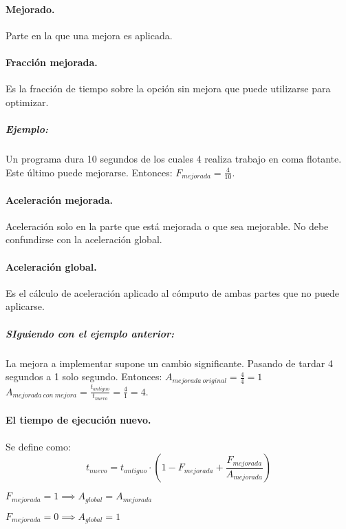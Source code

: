 \documentclass{article}
\begin{document}
\begin{multicols}{2}
		\paragraph{Mejorado.}
		Parte en la que una mejora es aplicada.
		
		\paragraph{Fracción mejorada.}
		Es la fracción de tiempo sobre la opción sin mejora que puede utilizarse para optimizar. 
		
		\subparagraph{Ejemplo:}
		Un programa dura 10 segundos de los cuales 4 realiza trabajo en coma flotante. Este último puede mejorarse. Entonces: \newline $F_{mejorada} = \frac {4} {10}$.
		
		\paragraph{Aceleración mejorada.}
		Aceleración solo en la parte que está mejorada o que sea mejorable. No debe confundirse con la aceleración global.
		
		\paragraph{Aceleración global.}
		Es el cálculo de aceleración aplicado al cómputo de ambas partes que no puede aplicarse.
		
		\subparagraph{SIguiendo con el ejemplo anterior:}
		La mejora a implementar supone un cambio significante. Pasando de tardar 4 segundos a 1 solo segundo. Entonces: \newline $A_{mejorada\ original} = \frac {4} {4} = 1$ \newline $A_{mejorada\ con\ mejora} = \frac {t_{antiguo}} {t_{nuevo}} = \frac {4} {1} = 4$.
		
		\paragraph{El tiempo de ejecución nuevo.}
		Se define como:
		\begin{displaymath}
			t_{nuevo} = t_{antiguo} \cdot ( 1 - F_{mejorada} + \frac {F_{mejorada}} {A_{mejorada}})
		\end{displaymath}
		
		$F_{mejorada} = 1 \implies A_{global} = A_{mejorada}$
		
		$F_{mejorada} = 0 \implies A_{global} = 1$
		

\end{multicols}
\end{document}

